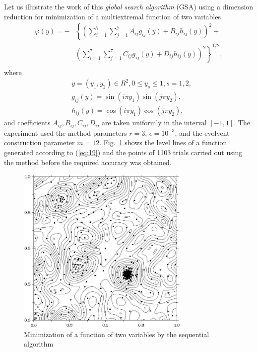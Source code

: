 \documentclass[smallcondensed]{svjour3}     %
\begin{document}
Let us illustrate the work of this \textit{global search algorithm} (GSA) using a dimension reduction for minimization of a multiextremal function of two variables 
\begin{eqnarray} \nonumber \label{eq:19}
\varphi(y)= -&\left\{\left(\sum^{7}_{i=1}\sum^{7}_{j=1}A_{ij}g_{ij}(y)+B_{ij}h_{ij}(y)\right)^2+\right. \\
&\left.\left(\sum^{7}_{i=1}\sum^{7}_{j=1}C_{ij}g_{ij}(y)+D_{ij}h_{ij}(y)\right)^2\right\}^{1/2},\\ \nonumber
\end{eqnarray}
where
\begin{eqnarray} \nonumber
& y=(y_1,y_2)\in R^2, 0 \leq y_s \leq 1, s=1,2, \\ \nonumber
& g_{ij}(y)=\sin(i\pi y_1)\sin(j\pi y_2),  \\ \nonumber
& h_{ij}(y)=\cos(i\pi y_1)\cos(j\pi y_2), \nonumber 
\end{eqnarray}
and coefficients $A_{ij}, B_{ij}, C_{ij}, D_{ij}$  are taken uniformly in the interval $[-1,1]$. The experiment used the method parameters $r=3$, $\epsilon=10^{-3}$, and the evolvent construction parameter $m=12$. Fig.~\ref{fig:1} shows the level lines of a function generated according to (\ref{eq:19}) and the points of 1103 trials carried out using the method before the required accuracy was obtained.
\begin{figure}
	\center
  \includegraphics[width=0.75\textwidth]{fig2.jpg} 
  \caption{Minimization of a function of two variables by the sequential algorithm}
  \label{fig:1}       %
\end{figure}
\end{document}
